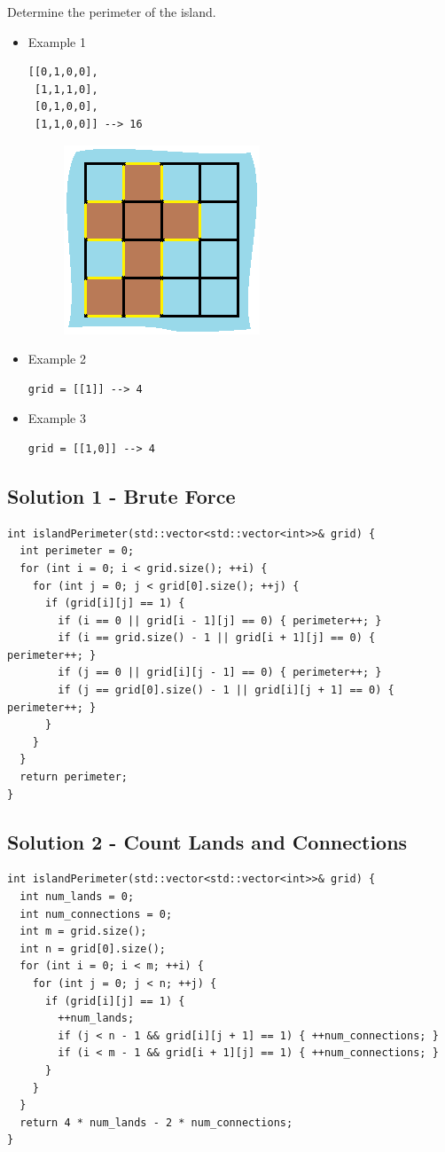Determine the perimeter of the island.

\begin{itemize}
\item Example 1
\begin{lstlisting}
[[0,1,0,0],
 [1,1,1,0],
 [0,1,0,0],
 [1,1,0,0]] --> 16
\end{lstlisting}
\begin{figure}[H]
\centering
\includegraphics[width=0.2\linewidth]{images/lc0463_eg}
\label{fig:lc0463eg}
\end{figure}
\item Example 2
\begin{lstlisting}
grid = [[1]] --> 4
\end{lstlisting}
\item Example 3
\begin{lstlisting}
grid = [[1,0]] --> 4
\end{lstlisting}
\end{itemize}

\subsection*{Solution 1 - Brute Force}
\begin{lstlisting}
int islandPerimeter(std::vector<std::vector<int>>& grid) {
  int perimeter = 0;
  for (int i = 0; i < grid.size(); ++i) {
    for (int j = 0; j < grid[0].size(); ++j) {
      if (grid[i][j] == 1) {
        if (i == 0 || grid[i - 1][j] == 0) { perimeter++; }
        if (i == grid.size() - 1 || grid[i + 1][j] == 0) { perimeter++; }
        if (j == 0 || grid[i][j - 1] == 0) { perimeter++; }
        if (j == grid[0].size() - 1 || grid[i][j + 1] == 0) { perimeter++; }
      }
    }
  }
  return perimeter;
}
\end{lstlisting}

\subsection*{Solution 2 - Count Lands and Connections}
\begin{lstlisting}
int islandPerimeter(std::vector<std::vector<int>>& grid) {
  int num_lands = 0;
  int num_connections = 0;
  int m = grid.size();
  int n = grid[0].size();
  for (int i = 0; i < m; ++i) {
    for (int j = 0; j < n; ++j) {
      if (grid[i][j] == 1) {
        ++num_lands;
        if (j < n - 1 && grid[i][j + 1] == 1) { ++num_connections; }
        if (i < m - 1 && grid[i + 1][j] == 1) { ++num_connections; }
      }
    }
  }
  return 4 * num_lands - 2 * num_connections;
}
\end{lstlisting}

